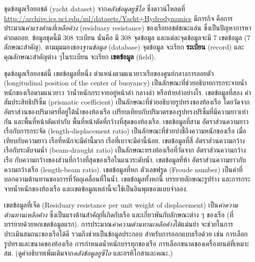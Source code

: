 \begin{Exercise}
	\label{ex: ann yacht}

ชุดข้อมูลเรือยอชต์ (yacht dataset)
%
จาก\textit{คลังข้อมูลยูซีไอ}\cite{Bache+Lichman:2013} 
ซึ่งดาวน์โหลดที่
\url{http://archive.ics.uci.edu/ml/datasets/Yacht+Hydrodynamics}
%
มีภารกิจ
คือการประมาณ\textit{ค่าแรงต้านที่เหลือค้าง} (residuary resistance) ของเรือยอชต์ขณะแล่น 
ซึ่งเป็นปัญหาการหาค่าถดถอย.
%
ข้อมูลชุดนี้มี $308$ ระเบียน 
นั่นคือ มี $308$ จุดข้อมูล 
และแต่ละจุดข้อมูลจะมี $7$ เขตข้อมูล ($7$ ลักษณะสำคัญ).
ตามมุมมองของ\textit{ฐานข้อมูล} (database)
จุดข้อมูล จะเรียก \textbf{ระเบียน} (record)
และคุณลักษณะสำคัญต่าง ๆในระเบียน
จะเรียก \textbf{เขตข้อมูล} (field).

ชุดข้อมูลเรือยอชต์นี้ เขตข้อมูลที่หนึ่ง
ตำแหน่งตามแนวยาวเรือของศูนย์กลางการลอยตัว (longitudinal position of the center of buoyancy) เป็นลักษณะที่ช่วยอธิบายการกระจายน้ำหนักของเรือตามแนวยาว ว่าน้ำหนักกระจายอยู่หน้าลำ กลางลำ หรือท้ายลำอย่างไร.
เขตข้อมูลที่สอง ค่าสัมประสิทธิปริซึ่ม (prismatic coefficient) เป็นลักษณะที่ช่วยอธิบายรูปทรงของท้องเรือ 
โดยวัดจากอัตราส่วนของปริมาตรที่อยู่ใต้น้ำของท้องเรือ 
เปรียบเทียบกับปริมาตรของรูปทรงปริซึ่มที่มีความยาวเท่ากัน 
และพื้นที่หน้าตัดเท่ากับ พื้นที่หน้าตัดที่กว้างที่สุดของท้องเรือ.
เขตข้อมูลที่สาม 
อัตราส่วนความยาวเรือกับการกระจัด (length-displacement ratio) เป็นลักษณะที่ช่วยบ่งชี้ถึงความหนักของเรือ
เมื่อเทียบกับความยาว เรือที่หนักจะมีค่านี้มาก เรือที่เบาจะมีค่านี้น้อย.
เขตข้อมูลที่สี่ 
อัตราส่วนความกว้างเรือกับระดับจมน้ำ (beam-draught ratio) เป็นลักษณะทรงท้องเรือที่วัดจาก อัตราส่วนความกว้างเรือ
กับความกว้างของส่วนที่กว้างที่สุดของเรือในแนวระดับน้ำ.
เขตข้อมูลที่ห้า 
อัตราส่วนความยาวกับความกว้างเรือ (length-beam ratio).
เขตข้อมูลที่หก
ตัวเลขฟรูด (Froude number) เป็นค่าที่บอกความต้านทานของการที่วัตถุเคลื่อนที่ในน้ำ.
เขตข้อมูลทั้งหกนี้
บรรยายลักษณะรูปร่าง
และการกระจายน้ำหนักของท้องเรือ และเขตข้อมูลเหล่านี้จะใช้เป็นอินพุตของแบบจำลอง.

เขตข้อมูลที่เจ็ด 
(Residuary resistance per unit weight of displacement) 
เป็น\textit{ค่าความต้านทานเหลือค้าง}
ซึ่งเป็นแรงต้านสำคัญที่เกิดกับเรือ และเกี่ยวพันกับลักษณะต่าง ๆ ของเรือ (ที่บรรยายด้วยหกเขตข้อมูลแรก). 
การประมาณ\textit{ค่าความต้านทานเหลือค้าง}ได้แม่นยำ
จะช่วยในการประเมินสมถนะของเรือได้ดี
รวมถึงช่วยเป็นข้อมูลประกอบ
สำหรับการออกแบบเรือด้วย เช่น การเลือกรูปทรงและขนาดของท้องเรือ การกำหนดน้ำหนักบรรทุกของเรือ การเลือกขนาดของเครื่องยนต์ที่เหมาะสม.
(ดูคำอธิบายเพิ่มเติมจาก\textit{คลังข้อมูลยูซีไอ} และอรทิโกสาและคณะ\cite{OrtigosaEtAl2007a}.)


\end{Exercise}
